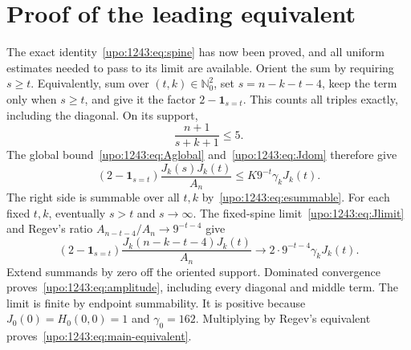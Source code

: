 \documentclass[11pt,letterpaper]{article}
\theoremstyle{remark}\newtheorem{remark}[theorem]{Remark}
\numberwithin{equation}{section}
\newcommand{\N}{\mathbb N_0}
\begin{document}
\section{Proof of the leading equivalent}\label{upo:1243:sec:leading}
The exact identity~\eqref{upo:1243:eq:spine} has now been proved, and all uniform
estimates needed to pass to its limit are available. Orient the sum by
requiring $s\ge t$. Equivalently, sum over $(t,k)\in\N^2$, set
$s=n-k-t-4$, keep the term only when $s\ge t$, and give it the factor
$2-\mathbf1_{s=t}$. This counts all triples exactly, including the
diagonal. On its support,
\[
 \frac{n+1}{s+k+1}\le5.
\]
The global bound~\eqref{upo:1243:eq:Aglobal} and~\eqref{upo:1243:eq:Jdom} therefore give
\begin{equation}\label{upo:1243:eq:convdom}
 (2-\mathbf1_{s=t})\frac{J_k(s)J_k(t)}{A_n}
 \le K9^{-t}\gamma_kJ_k(t).
\end{equation}
The right side is summable over all $t,k$ by~\eqref{upo:1243:eq:esummable}.
For each fixed $t,k$, eventually $s>t$ and $s\to\infty$. The fixed-spine
limit~\eqref{upo:1243:eq:Jlimit} and Regev's ratio
$A_{n-t-4}/A_n\to9^{-t-4}$ give
\[
 (2-\mathbf1_{s=t})\frac{J_k(n-k-t-4)J_k(t)}{A_n}
 \longrightarrow2\cdot9^{-t-4}\gamma_kJ_k(t).
\]
Extend summands by zero off the oriented support. Dominated convergence
proves~\eqref{upo:1243:eq:amplitude}, including every diagonal and middle term.
The limit is finite by endpoint summability. It is positive because
$J_0(0)=H_0(0,0)=1$ and $\gamma_0=162$. Multiplying by
Regev's equivalent proves~\eqref{upo:1243:eq:main-equivalent}.
\end{document}
